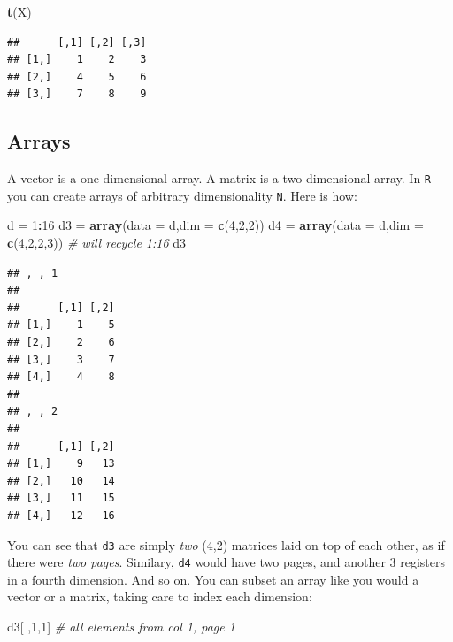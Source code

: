 \documentclass[]{book}
\newenvironment{Shaded}{\begin{snugshade}}{\end{snugshade}}
\newcommand{\KeywordTok}[1]{\textcolor[rgb]{0.13,0.29,0.53}{\textbf{#1}}}
\newcommand{\DataTypeTok}[1]{\textcolor[rgb]{0.13,0.29,0.53}{#1}}
\newcommand{\DecValTok}[1]{\textcolor[rgb]{0.00,0.00,0.81}{#1}}
\newcommand{\StringTok}[1]{\textcolor[rgb]{0.31,0.60,0.02}{#1}}
\newcommand{\CommentTok}[1]{\textcolor[rgb]{0.56,0.35,0.01}{\textit{#1}}}
\newcommand{\OperatorTok}[1]{\textcolor[rgb]{0.81,0.36,0.00}{\textbf{#1}}}
\newcommand{\NormalTok}[1]{#1}
\theoremstyle{definition}
\theoremstyle{definition}
\theoremstyle{definition}
\theoremstyle{remark}
\begin{document}
\begin{Shaded}
\begin{Highlighting}[]
\KeywordTok{t}\NormalTok{(X)}
\end{Highlighting}
\end{Shaded}

\begin{verbatim}
##      [,1] [,2] [,3]
## [1,]    1    2    3
## [2,]    4    5    6
## [3,]    7    8    9
\end{verbatim}

\subsection{Arrays}\label{arrays}

A vector is a one-dimensional array. A matrix is a two-dimensional
array. In \texttt{R} you can create arrays of arbitrary dimensionality
\texttt{N}. Here is how:

\begin{Shaded}
\begin{Highlighting}[]
\NormalTok{d =}\StringTok{ }\DecValTok{1}\OperatorTok{:}\DecValTok{16}
\NormalTok{d3 =}\StringTok{ }\KeywordTok{array}\NormalTok{(}\DataTypeTok{data =}\NormalTok{ d,}\DataTypeTok{dim =} \KeywordTok{c}\NormalTok{(}\DecValTok{4}\NormalTok{,}\DecValTok{2}\NormalTok{,}\DecValTok{2}\NormalTok{))}
\NormalTok{d4 =}\StringTok{ }\KeywordTok{array}\NormalTok{(}\DataTypeTok{data =}\NormalTok{ d,}\DataTypeTok{dim =} \KeywordTok{c}\NormalTok{(}\DecValTok{4}\NormalTok{,}\DecValTok{2}\NormalTok{,}\DecValTok{2}\NormalTok{,}\DecValTok{3}\NormalTok{))  }\CommentTok{# will recycle 1:16}
\NormalTok{d3}
\end{Highlighting}
\end{Shaded}

\begin{verbatim}
## , , 1
## 
##      [,1] [,2]
## [1,]    1    5
## [2,]    2    6
## [3,]    3    7
## [4,]    4    8
## 
## , , 2
## 
##      [,1] [,2]
## [1,]    9   13
## [2,]   10   14
## [3,]   11   15
## [4,]   12   16
\end{verbatim}

You can see that \texttt{d3} are simply \emph{two} (4,2) matrices laid
on top of each other, as if there were \emph{two pages}. Similary,
\texttt{d4} would have two pages, and another 3 registers in a fourth
dimension. And so on. You can subset an array like you would a vector or
a matrix, taking care to index each dimension:

\begin{Shaded}
\begin{Highlighting}[]
\NormalTok{d3[ ,}\DecValTok{1}\NormalTok{,}\DecValTok{1}\NormalTok{]  }\CommentTok{# all elements from col 1, page 1}
\end{Highlighting}
\end{Shaded}
\end{document}
